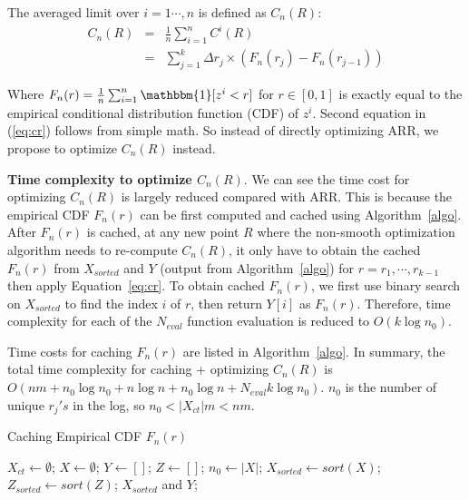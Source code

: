 The averaged limit over $i=1\cdots, n$ is defined as $C_n(R)$:
\vspace{-0.1in}
\begin{eqnarray}
C_n(R) &=& \frac{1}{n}\sum_{i=1}^n C^i(R)\nonumber\\
&=& \sum_{j=1}^k \Delta r_j \times (F_n(r_j) - F_n(r_{j-1}))\label{eq:cr}
\end{eqnarray} 
\vspace{-0.1in}

Where $F_n(r) = \frac{1}{n}\sum_{i=1}^n \mathbbm{1}[z^i < r]$ for $r\in [0, 1]$ is exactly equal to the empirical conditional distribution function (CDF) of $z^i$. Second equation in (\ref{eq:cr}) follows from simple math. So instead of directly optimizing ARR, we propose to optimize $C_n(R)$ instead.

\textbf{Time complexity to optimize $C_n(R)$}. We can see the time cost for optimizing $C_n(R)$ is largely reduced compared with ARR. This is because the empirical CDF $F_n(r)$ can be first computed and cached using Algorithm~\ref{algo}. After $F_n(r)$ is cached, at any new point $R$ where the non-smooth optimization algorithm needs to re-compute $C_n(R)$, it only have to obtain the cached $F_n(r)$ from $X_{sorted}$ and $Y$ (output from Algorithm~\ref{algo}) for $r = r_1, \cdots, r_{k-1}$ then apply Equation~\ref{eq:cr}. To obtain cached $F_n(r)$, we first use binary search on $X_{sorted}$ to find the index $i$ of $r$, then return $Y[i]$ as $F_n(r)$. Therefore, time complexity for each of the $N_{eval}$ function evaluation is reduced to $O(k\log n_0)$. 

Time costs for caching $F_n(r)$ are listed in Algorithm~\ref{algo}. In summary, the total time complexity for caching + optimizing $C_n(R)$ is $O(nm + n_0\log{n_0} + n \log{n} + n_0\log{n} + N_{eval}k\log{n_0})$. $n_0$ is the number of unique $r_j's$ in the log, so $n_0 < |X_{ct}|m < nm$. 

\vspace{-0.05in}
\begin{algorithm}
\caption{Caching Empirical CDF $F_n(r)$\label{algo}}
\DontPrintSemicolon
  $X_{ct}\leftarrow \emptyset$; 
  $X\leftarrow \emptyset$; 
  $Y\leftarrow []$; 
  $Z\leftarrow []$; 
  $n_0\leftarrow |X|$;\;
  $X_{sorted}\leftarrow sort(X)$;
  $Z_{sorted}\leftarrow sort(Z)$;
  \Return $X_{sorted}$ and $Y$;
\end{algorithm}
\vspace{-0.2in}

